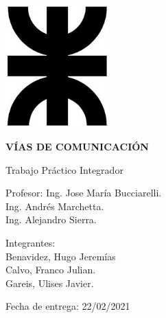 \documentclass[../main.tex]{subfiles}
\begin{document}
\begin{titlepage}
\begin{center}
    \vspace{-0.5cm}   
    \includegraphics[width=0.3\textwidth]{images/logoutn.jpg}
    \vspace{0.5cm}
    
    \LARGE
    \textbf{VÍAS DE COMUNICACIÓN}
    \vspace{2.5cm}
    
    \huge
    Trabajo Práctico Integrador
    \vspace{0.4cm}
    
    \huge
    \vspace{2.5cm}
    
   \large
    Profesor: Ing. Jose María Bucciarelli.\\
    Ing. Andrés Marchetta. \\
    Ing. Alejandro Sierra. \\

    \vspace{1.5cm}
    
    Integrantes:
    \\Benavidez, Hugo Jeremías
    \\Calvo, Franco Julian.
    \\Gareis, Ulises Javier.\\
    \vspace{2cm}
    
    Fecha de entrega: 22/02/2021
\vfill
\end{center}
\end{titlepage}
\clearpage
\end{document}
